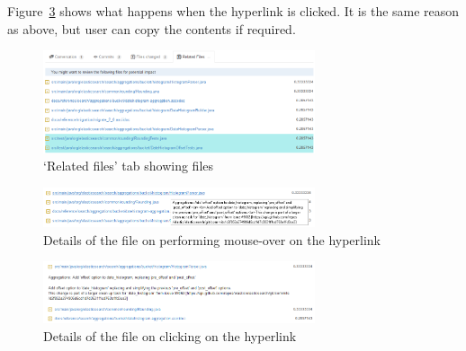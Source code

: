 Figure~\ref{fig:clickOnFileHyperlink} shows what happens when the hyperlink is clicked. It is the same reason as above, but user can copy the contents if required.

\begin{figure}[ht!]
\centering
\includegraphics[width=8cm]{RelatedFilesContents}
\caption{`Related files' tab showing files}
\label{fig:relatedFilesContents}
\end{figure}

\begin{figure}[ht!]
\centering
\includegraphics[width=8cm]{MouseOverOfFile}
\caption{Details of the file on performing mouse-over on the hyperlink}
\label{fig:mouseOverOnFile}
\end{figure}

\begin{figure}[ht!]
\centering
\includegraphics[width=8cm]{ClickOfFileHyperlink}
\caption{Details of the file on clicking on the hyperlink}
\label{fig:clickOnFileHyperlink}
\end{figure}

